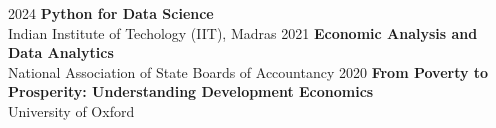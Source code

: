 \datedsubsection{ }
{%
    2024}
{%
    \textbf{Python for Data Science}
} \\
Indian Institute of Techology (IIT), Madras
\vspace{-0.8em}
\datedsubsection{ }
{%
    2021}
{%
    \textbf{Economic Analysis and Data Analytics}
} \\
 National Association of State Boards of Accountancy
\vspace{-0.8em}
\datedsubsection{ }
{%
    2020}
{%
    \textbf{From Poverty to Prosperity: Understanding Development Economics}
} \\
University of Oxford
